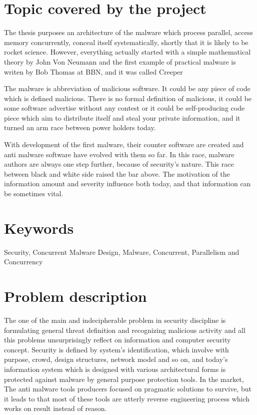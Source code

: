 \documentclass[informationsecurity]{gucmasterproject}
\begin{document}
\section{Topic covered by the project}
The thesis purposes an architecture of the malware which process parallel, access memory concurrently, conceal itself systematically, shortly that it is likely to be rocket science. However, everything actually started with a simple mathematical theory by John Von Neumann \cite{von1966theory} and the first example of practical malware is writen by Bob Thomas at BBN, and it was called Creeper 

The malware is abbreviation of malicious software. It could be any piece of code which is defined malicious. There is no formal definition of malicious, it could be some software advertise without any contest or it could be self-producing code piece which aim to distribute itself and steal your private information, and it turned an arm race between power holders today.

With development of the first malware, their counter software are created and anti malware software have evolved with them so far. In this race, malware authors are always one step further, because of security's nature. This race between black and white side raised the bar above. The motivation of the information amount and severity influence both today, and that information can be sometimes vital. 


\section{Keywords}
Security, Concurrent Malware Design, Malware, Concurrent, Parallelism and Concurrency

\section{Problem description}
The one of the main and indecipherable problem in security discipline is formulating general threat definition and recognizing malicious activity and all this problems unsurprisingly reflect on information and computer security concept. Security is defined by system’s identification, which involve with purpose, crowd, design structures, network model and so on, and today’s information system which is designed with various architectural forms is protected against malware by general purpose protection tools. In the market, The anti malware tools producers focused on pragmatic solutions to survive, but it leads to that most of these tools are utterly reverse engineering process which works on result instead of reason.
\end{document}
